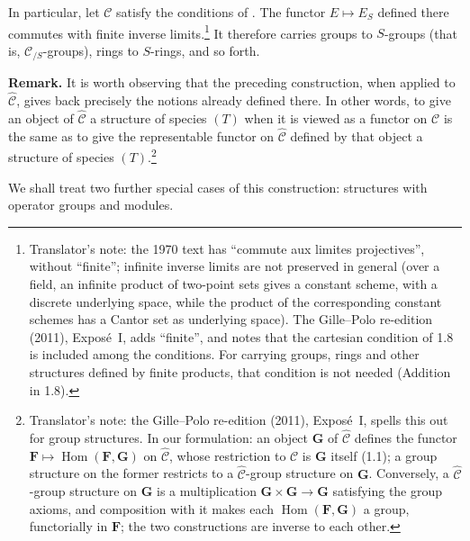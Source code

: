 In particular, let \(\mathscr C\) satisfy the conditions of . The functor
\(E\mapsto E_S\) defined there commutes with finite inverse
limits.\footnote{Translator's note: the 1970 text has ``commute aux limites
projectives'', without ``finite''; infinite inverse limits are not preserved
in general (over a field, an infinite product of two-point sets gives a
constant scheme, with a discrete underlying space, while the product of the
corresponding constant schemes has a Cantor set as underlying space). The
Gille--Polo re-edition (2011), Exposé~I, adds ``finite'', and notes that
the cartesian condition of 1.8 is included among the conditions. For
carrying groups, rings and other structures defined by finite products,
that condition is not needed (Addition in 1.8).} It
therefore carries groups to \(S\)-groups (that is,
\(\mathscr C_{/S}\)-groups), rings to \(S\)-rings, and so forth.

\medskip
\noindent\textbf{Remark.}
It is worth observing that the preceding construction, when applied to
\(\widehat{\mathscr C}\), gives back precisely the notions already defined
there. In other words, to give an object of \(\widehat{\mathscr C}\) a
structure of species \((T)\) when it is viewed as a functor on
\(\mathscr C\) is the same as to give the representable functor on
\(\widehat{\mathscr C}\) defined by that object a structure of species
\((T)\).\footnote{Translator's note: the Gille--Polo re-edition (2011), Exposé~I, spells this out for
group structures. In our formulation: an object \(\mathbf G\) of
\(\widehat{\mathscr C}\) defines the functor
\(\mathbf F\mapsto\operatorname{Hom}(\mathbf F,\mathbf G)\) on
\(\widehat{\mathscr C}\), whose restriction to \(\mathscr C\) is
\(\mathbf G\) itself (1.1); a group structure on the former restricts to a
\(\widehat{\mathscr C}\)-group structure on \(\mathbf G\). Conversely, a
\(\widehat{\mathscr C}\)-group structure on \(\mathbf G\) is a
multiplication \(\mathbf G\times\mathbf G\to\mathbf G\) satisfying the group
axioms, and composition with it makes each
\(\operatorname{Hom}(\mathbf F,\mathbf G)\) a group, functorially in
\(\mathbf F\); the two constructions are inverse to each other.}

We shall treat two further special cases of this construction: structures
with operator groups and modules.

